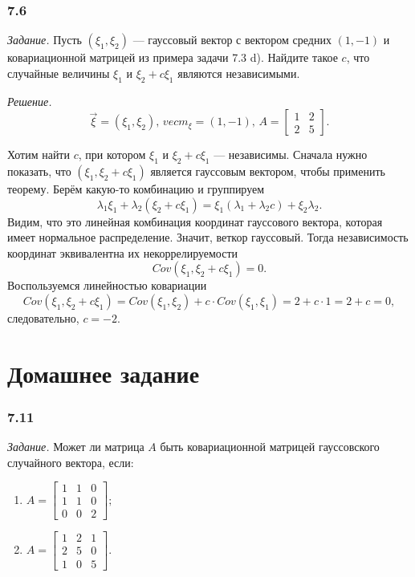 \subsubsection*{7.6}

\textit{Задание.}
Пусть $ \left( \xi_1, \xi_2 \right) $ ---
гауссовый вектор с вектором средних $ \left( 1, -1 \right) $
и ковариационной матрицей из примера задачи 7.3 d).
Найдите такое $c$, что случайные величины $ \xi_1$ и $ \xi_2 + c \xi_1$ являются независимыми.

\textit{Решение.}
$$ \vec{ \xi } = \left( \xi_1, \xi_2 \right), \,
  vec{m}_{ \xi } = \left(1, -1 \right), \,
  A =
  \begin{bmatrix}
    1 & 2 \\
    2 & 5
  \end{bmatrix}.$$

Хотим найти $c$, при котором $ \xi_1$ и $ \xi_2 + c \xi_1$ --- независимы.
Сначала нужно показать, что $ \left( \xi_1, \xi_2 + c \xi_1 \right) $ является гауссовым вектором,
чтобы применить теорему.
Берём какую-то комбинацию и группируем
$$ \lambda_1 \xi_1 + \lambda_2 \left( \xi_2 + c \xi_1 \right) =
  \xi_1 \left( \lambda_1 + \lambda_2 c \right) + \xi_2 \lambda_2.$$
Видим, что это линейная комбинация координат гауссового вектора,
которая имеет нормальное распределение.
Значит, веткор гауссовый.
Тогда независимость координат эквивалентна их некоррелируемости
$$Cov \left( \xi_1, \xi_2 + c \xi_1 \right) =
  0.$$
Воспользуемся линейностью ковариации
$$Cov \left( \xi_1, \xi_2 + c \xi_1 \right) =
  Cov \left( \xi_1, \xi_2 \right) + c \cdot Cov \left( \xi_1, \xi_1 \right) =
  2 + c \cdot 1 =
  2 + c =
  0,$$
следовательно, $c = -2$.

\section*{Домашнее задание}

\subsubsection*{7.11}

\textit{Задание.}
Может ли матрица $A$ быть ковариационной матрицей гауссовского случайного вектора, если:
\begin{enumerate}[label=\alph*)]
  \item $A =
    \begin{bmatrix}
      1 & 1 & 0 \\
      1 & 1 & 0 \\
      0 & 0 & 2
    \end{bmatrix};$
  \item $A =
    \begin{bmatrix}
      1 & 2 & 1 \\
      2 & 5 & 0 \\
      1 & 0 & 5
    \end{bmatrix}.$
\end{enumerate}

